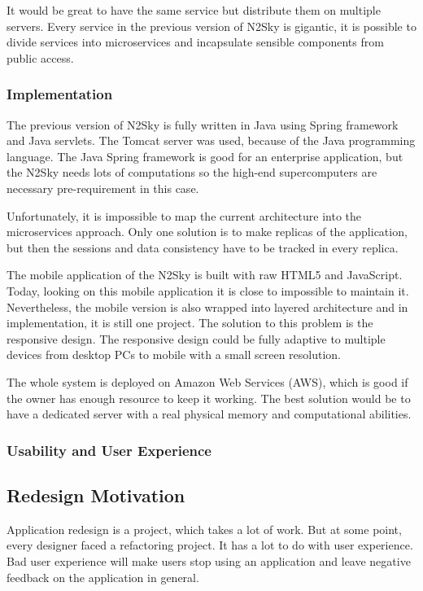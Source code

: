 It would be great to have the same service but distribute them on multiple servers. Every service in the previous version of N2Sky is gigantic, it is possible to divide services into microservices and incapsulate sensible components from public access.


\subsubsection{Implementation}\label{Implementation}

The previous version of N2Sky is fully written in Java using Spring framework and Java servlets. The Tomcat server was used, because of the Java programming language. The  Java Spring framework is good for an enterprise application, but the N2Sky needs lots of computations so the high-end supercomputers are necessary pre-requirement in this case. 

Unfortunately, it is impossible to map the current architecture into the microservices approach. Only one solution is to make replicas of the application, but then the sessions and data consistency have to be tracked in every replica. 

The mobile application of the N2Sky is built with raw HTML5 and JavaScript. Today, looking on this mobile application it is close to impossible to maintain it. Nevertheless,  the mobile version is also wrapped into layered architecture and in implementation, it is still one project. The solution to this problem is the responsive design. The responsive design could be fully adaptive to multiple devices from desktop PCs to mobile with a small screen resolution.

The whole system is deployed on Amazon Web Services (AWS), which is good if the owner has enough resource to keep it working. The best solution would be to have a dedicated server with a real physical memory and computational abilities.  


\subsubsection{Usability and User Experience}\label{Usabilityanduserexperience}



\subsection{Redesign Motivation}\label{Redesignmotivation}

Application redesign is a project, which takes a lot of work. But at some point, every designer faced a refactoring project. It has a lot to do with user experience. Bad user experience will make users stop using an application and leave negative feedback on the application in general. 

